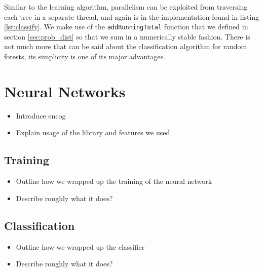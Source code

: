 \documentclass[12pt,twoside,notitlepage]{report}
\begin{document}
          Similar to the learning algorithm, parallelism can be exploited from traversing each tree in a separate 
          thread, and again is in the implementation found in listing \ref{lst:classify}. We make use of the 
          \texttt{addRunningTotal} function that we defined in section \ref{sec:prob_dist} so that we sum in a 
          numerically stable fashion. There is not much more that can be said about the classification algorithm for 
          random forests, its simplicity is one of its major advantages.






    \section{Neural Networks}
        \begin{framed}
            \begin{itemize}
                \item Introduce encog
                \item Explain usage of the library and features we used
            \end{itemize}
        \end{framed}

        \subsection{Training}
            \begin{framed}
                \begin{itemize}
                    \item Outline how we wrapped up the training of the neural network
                    \item Describe roughly what it does?
                \end{itemize}
            \end{framed}

        \subsection{Classification}
            \begin{framed}
                \begin{itemize}
                    \item Outline how we wrapped up the classifier
                    \item Describe roughly what it does?
                \end{itemize}
            \end{framed}
\end{document}

